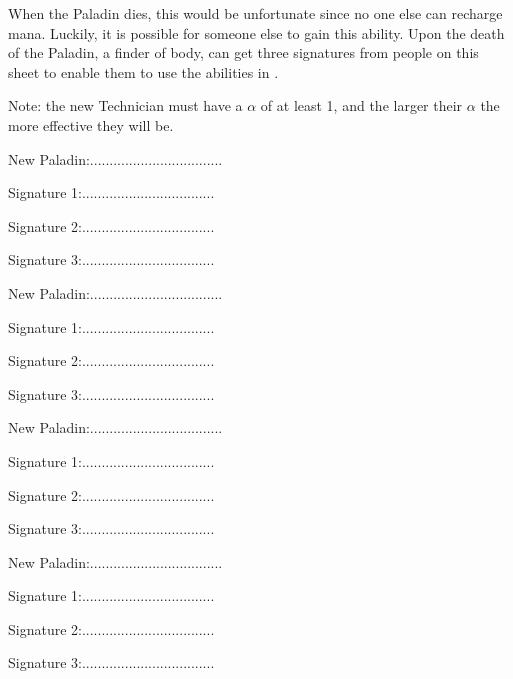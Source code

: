 \documentclass[green]{guildcamp3}
\begin{document}
\name{\gNewPaladin{}}

When the Paladin dies, this would be unfortunate since no one else can recharge mana. Luckily, it is possible for someone else to gain this ability. Upon the death of the Paladin, a finder of  body, can get three signatures from \bMagicWorld{} people on this sheet to enable them to use the abilities in \gManaRecharge{}.

Note: the new Technician must have a $\alpha$ of at least 1, and the larger their $\alpha$ the more effective they will be.


New Paladin:..................................

Signature 1:..................................

Signature 2:..................................

Signature 3:..................................


New Paladin:..................................

Signature 1:..................................

Signature 2:..................................

Signature 3:..................................


New Paladin:..................................

Signature 1:..................................

Signature 2:..................................

Signature 3:..................................


New Paladin:..................................

Signature 1:..................................

Signature 2:..................................

Signature 3:..................................
\end{document}
